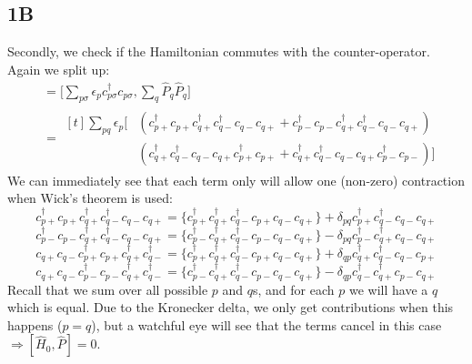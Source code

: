 \documentclass[norsk,a4paper,12pt]{article}
\begin{document}
\subsection*{1B}
Secondly, we check if the Hamiltonian commutes with the counter-operator. Again we split up:
\begin{align*}
[\hat{H}_0, \hat{P}]&=\Big[\sum_{p\sigma}\epsilon_pc_{p\sigma}^{\dagger}c_{p\sigma},\sum_q\hat{P}_q\hat{P}_q\Big]\\
&= \begin{aligned}[t]
\sum_{pq}\epsilon_p\Big[&(c_{p+}^{\dagger}c_{p+}c_{q+}^{\dagger}c_{q-}^{\dagger}c_{q-}c_{q+}
+c_{p-}^{\dagger}c_{p-}c_{q+}^{\dagger}c_{q-}^{\dagger}c_{q-}c_{q+})\\
&(c_{q+}^{\dagger}c_{q-}^{\dagger}c_{q-}c_{q+}c_{p+}^{\dagger}c_{p+}
+c_{q+}^{\dagger}c_{q-}^{\dagger}c_{q-}c_{q+}c_{p-}^{\dagger}c_{p-})\Big]
\end{aligned}
\end{align*}
We can immediately see that each term only will allow one (non-zero) contraction when Wick's theorem is used:
\begin{equation*}
c_{p+}^{\dagger}c_{p+}c_{q+}^{\dagger}c_{q-}^{\dagger}c_{q-}c_{q+}=\{c_{p+}^{\dagger}c_{q+}^{\dagger}c_{q-}^{\dagger}c_{p+}c_{q-}c_{q+}\}+\delta_{pq}c_{p+}^{\dagger}c_{q-}^{\dagger}c_{q-}c_{q+}
\end{equation*}
\begin{equation*}
c_{p-}^{\dagger}c_{p-}c_{q+}^{\dagger}c_{q-}^{\dagger}c_{q-}c_{q+}=\{c_{p-}^{\dagger}c_{q+}^{\dagger}c_{q-}^{\dagger}c_{p-}c_{q-}c_{q+}\}-\delta_{pq}c_{p-}^{\dagger}c_{q+}^{\dagger}c_{q-}c_{q+}
\end{equation*}
\begin{equation*}
c_{q+}c_{q-}c_{p+}^{\dagger}c_{p+}c_{q+}^{\dagger}c_{q-}^{\dagger}=\{c_{p+}^{\dagger}c_{q+}^{\dagger}c_{q-}^{\dagger}c_{p+}c_{q-}c_{q+}\}+\delta_{qp}c_{q+}^{\dagger}c_{q-}^{\dagger}c_{q-}c_{p+}
\end{equation*}
\begin{equation*}
c_{q+}c_{q-}c_{p-}^{\dagger}c_{p-}c_{q+}^{\dagger}c_{q-}^{\dagger}=\{c_{p-}^{\dagger}c_{q+}^{\dagger}c_{q-}^{\dagger}c_{p-}c_{q-}c_{q+}\}-\delta_{qp}c_{q-}^{\dagger}c_{q+}^{\dagger}c_{p-}c_{q+}
\end{equation*}
Recall that we sum over all possible $p$ and $q$s, and for each $p$ we will have a $q$ which is equal. Due to the Kronecker delta, we only get contributions when this happens ($p=q$), but a watchful eye will see that the terms cancel in this case $\Rightarrow [\hat{H}_0,\hat{P}]=0$.
\end{document}
